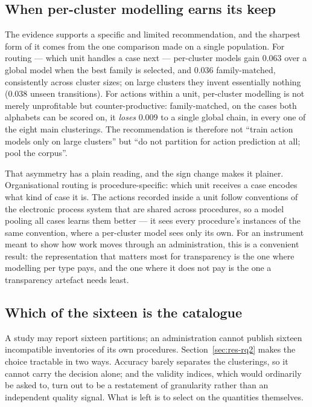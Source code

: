 \subsection{When per-cluster modelling earns its keep}

The evidence supports a specific and limited recommendation, and the sharpest form of it comes
from the one comparison made on a single population. For routing --- which unit handles a case
next --- per-cluster models gain 0.063 over a global model when the best family is selected, and
0.036 family-matched, consistently across cluster sizes; on large clusters they invent
essentially nothing (0.038 unseen transitions). For actions within a unit, per-cluster modelling
is not merely unprofitable but counter-productive: family-matched, on the cases both alphabets
can be scored on, it \emph{loses} 0.009 to a single global chain, in every one of the eight main
clusterings. The recommendation is therefore not ``train action models only on large clusters''
but ``do not partition for action prediction at all; pool the corpus''.

That asymmetry has a plain reading, and the sign change makes it plainer. Organisational routing
is procedure-specific: which unit receives a case encodes what kind of case it is. The actions
recorded inside a unit follow conventions of the electronic process system that are shared
across procedures, so a model pooling all cases learns them better --- it sees every procedure's
instances of the same convention, where a per-cluster model sees only its own. For an instrument
meant to show how work moves through an administration, this is a convenient result: the
representation that matters most for transparency is the one where modelling per type pays, and
the one where it does not pay is the one a transparency artefact needs least.

\subsection{Which of the sixteen is the catalogue}\label{sec:selection}

A study may report sixteen partitions; an administration cannot publish sixteen incompatible
inventories of its own procedures. Section~\ref{sec:res-rq2} makes the choice tractable in two
ways. Accuracy barely separates the clusterings, so it cannot carry the decision alone; and the
validity indices, which would ordinarily be asked to, turn out to be a restatement of
granularity rather than an independent quality signal. What is left is to select on the
quantities themselves.

